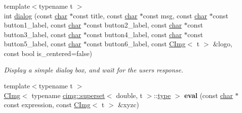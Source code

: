 \begin{DoxyCompactItemize}
{\footnotesize template$<$typename t $>$ }\\int \hyperlink{namespacecimg__library__suffixed_1_1cimg_a11aed0e6b30d75bf50946ee78d1aed94}{dialog} (const \hyperlink{classchar}{char} $\ast$const title, const \hyperlink{classchar}{char} $\ast$const msg, const \hyperlink{classchar}{char} $\ast$const button1\+\_\+label, const \hyperlink{classchar}{char} $\ast$const button2\+\_\+label, const \hyperlink{classchar}{char} $\ast$const button3\+\_\+label, const \hyperlink{classchar}{char} $\ast$const button4\+\_\+label, const \hyperlink{classchar}{char} $\ast$const button5\+\_\+label, const \hyperlink{classchar}{char} $\ast$const button6\+\_\+label, const \hyperlink{structcimg__library__suffixed_1_1CImg}{C\+Img}$<$ t $>$ \&logo, const bool is\+\_\+centered=false)
\begin{DoxyCompactList}\small\item\em Display a simple dialog box, and wait for the user\textquotesingle{}s response. \end{DoxyCompactList}\item 
\mbox{\label{namespacecimg__library__suffixed_1_1cimg_ad0fbf2581340a8533f5c3e3d86e2ce60}} 
{\footnotesize template$<$typename t $>$ }\\\hyperlink{structcimg__library__suffixed_1_1CImg}{C\+Img}$<$ typename \hyperlink{namespacecimg__library__suffixed_1_1cimg_d5/d9e/structcimg__library__suffixed_1_1cimg_1_1superset}{cimg\+::superset}$<$ double, t $>$\+::\hyperlink{structcimg__library__suffixed_1_1cimg_1_1type}{type} $>$ {\bfseries eval} (const \hyperlink{classchar}{char} $\ast$const expression, const \hyperlink{structcimg__library__suffixed_1_1CImg}{C\+Img}$<$ t $>$ \&xyzc)
\end{DoxyCompactItemize}
